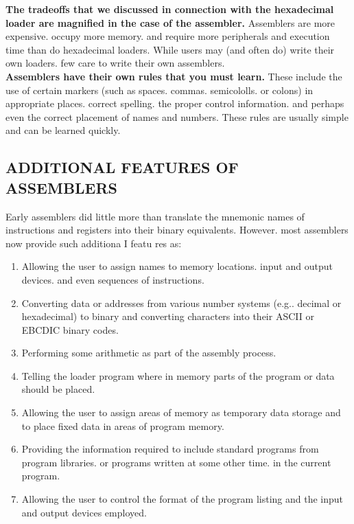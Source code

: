 \documentclass{book}
\begin{document}
\textbf{The tradeoffs that we discussed in connection with the hexadecimal loader are magnified in the case of the assembler.} Assemblers are more expensive. occupy more memory. and require more peripherals and execution time than do hexadecimal loaders. While users may (and often do) write their own loaders. few care to write their own assemblers.\\

\textbf{Assemblers have their own rules that you must learn.} These include the use of certain markers (such as spaces. commas. semicololls. or colons) in appropriate places. correct spelling. the proper control information. and perhaps even the correct placement of names and numbers. These rules are usually simple and can be learned quickly. 

\subsection*{ADDITIONAL FEATURES OF ASSEMBLERS}

Early assemblers did little more than translate the mnemonic names of instructions and
registers into their binary equivalents. However. most assemblers now provide such additiona I featu res as:
\begin{enumerate}
\item{Allowing the user to assign names to memory locations. input and output devices. and even sequences of instructions.}
\item{Converting data or addresses from various number systems (e.g.. decimal or hexadecimal) to binary and converting characters into their ASCII or EBCDIC binary codes.}
\item{Performing some arithmetic as part of the assembly process.}
\item{Telling the loader program where in memory parts of the program or data should be placed.}
\item{Allowing the user to assign areas of memory as temporary data storage and to place fixed data in areas of program memory.}
\item{Providing the information required to include standard programs from program libraries. or programs written at some other time. in the current program.}
\item{Allowing the user to control the format of the program listing and the input and output devices employed.}
\end{enumerate}
\end{document}
